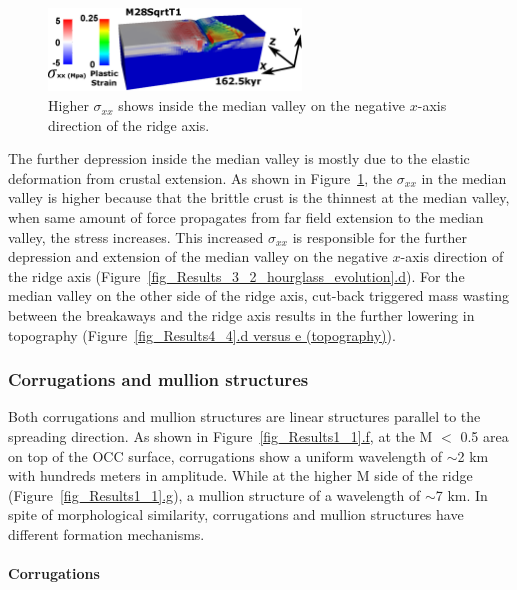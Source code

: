 \begin{figure}[h]
  \centering
    \includegraphics[width=0.6\textwidth]{./Figures/fig_Results4_7_sqrt_cut_back_conjugate_Sxx.eps}
  \caption{Higher $\sigma_{xx}$ shows inside the median valley on the negative $x$-axis direction of the ridge axis. }
 \label{fig_Results4_7}
\end{figure}

The further depression inside the median valley is mostly due to the elastic deformation from crustal extension. As shown in Figure~\hyperref[fig_Results4_7]{\ref{fig_Results4_7}}, the $\sigma_{xx}$ in the median valley is higher because that the brittle crust is the thinnest at the median valley, when same amount of force propagates from far field extension to the median valley, the stress increases. This increased $\sigma_{xx}$ is responsible for the further depression and extension of the median valley on the negative $x$-axis direction of the ridge axis (Figure~\hyperref[fig_Results_3_2_hourglass_evolution]{\ref{fig_Results_3_2_hourglass_evolution}.d}). For the median valley on the other side of the ridge axis, cut-back triggered mass wasting between the breakaways and the ridge axis results in the further lowering in topography (Figure~\hyperref[fig_Results4_4]{\ref{fig_Results4_4}.d versus e (topography)}). 

\subsubsection{Corrugations and mullion structures}

Both corrugations and mullion structures are linear structures parallel to the spreading direction. As shown in Figure~\hyperref[fig_Results1_1]{\ref{fig_Results1_1}.f}, at the M $<$ 0.5 area on top of the OCC surface, corrugations show a uniform wavelength of $\sim$2 km with hundreds meters in amplitude. While at the higher M side of the ridge (Figure~\hyperref[fig_Results1_1]{\ref{fig_Results1_1}.g}), a mullion structure of a wavelength of $\sim$7 km. In spite of morphological similarity, corrugations and mullion structures have different formation mechanisms. 

\paragraph{Corrugations}

